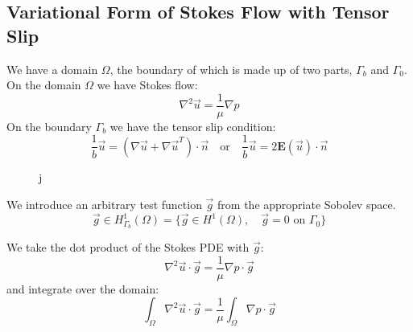 \documentclass[12pt, a4paper, twoside, openright]{book}
\begin{document}
\subsection*{Variational Form of Stokes Flow with Tensor Slip}

We have a domain $\Omega$, the boundary of which is made up of two parts, $\Gamma_b$ and $\Gamma_0$.  On the domain $\Omega$ we have Stokes flow:
\begin{equation}
\nabla^2 \vec{u} = \frac{1}{\mu} \nabla p
\end{equation}
On the boundary $\Gamma_b$ we have the tensor slip condition:
\begin{equation}
\frac{1}{b} \vec{u} = (\nabla \vec{u} + \nabla \vec{u}^T)\cdot \vec{n}
\quad \text{or} \quad
\frac{1}{b} \vec{u} = 2 \mathbf{E}(\vec{u}) \cdot \vec{n}
\end{equation}

\vspace{1em}
\begin{figure}[ht]
\centering
{}
\caption{j}\label{j}
\end{figure}

We introduce an arbitrary test function $\vec{g}$ from the appropriate Sobolev space.
\begin{equation}
\vec{g} \in H^1_{\Gamma_b}(\Omega) = 
\{ \vec{g} \in H^1(\Omega), \quad \vec{g}=0 \text{ on } \Gamma_0 \}
\end{equation}

We take the dot product of the Stokes PDE with $\vec{g}$:
\begin{equation}
\nabla^2 \vec{u} \cdot \vec{g} = \frac{1}{\mu} \nabla p \cdot \vec{g}
\end{equation}
and integrate over the domain:
\begin{equation}
\int_{\Omega} \nabla^2 \vec{u} \cdot \vec{g} = 
\frac{1}{\mu} \int_{\Omega}  \nabla p \cdot \vec{g}
\end{equation}

\end{document}

